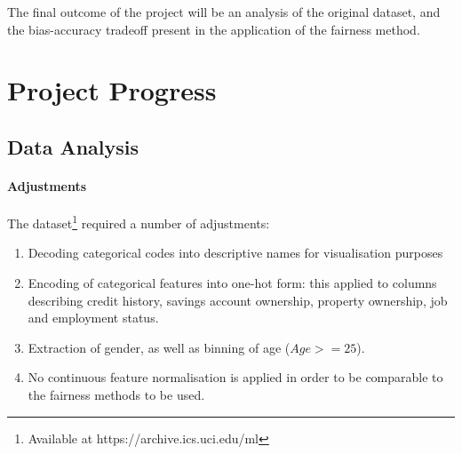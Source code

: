 \documentclass[conference]{IEEEtran}
\begin{document}
The final outcome of the project will be an analysis of the original dataset, and the bias-accuracy tradeoff present in the application of the fairness method. 
\section{Project Progress}
\subsection{Data Analysis}
\paragraph{Adjustments} The dataset\footnote{Available at https://archive.ics.uci.edu/ml} required a number of adjustments:
\begin{enumerate}
    \item Decoding categorical codes into descriptive names for visualisation purposes
    \item Encoding of categorical features into one-hot form: this applied to columns describing credit history, savings account ownership, property ownership, job and employment status.
    \item Extraction of gender, as well as binning of age ($Age >= 25$).
    \item No continuous feature normalisation is applied in order to be comparable to the fairness methods to be used.
\end{enumerate}
\end{document}

